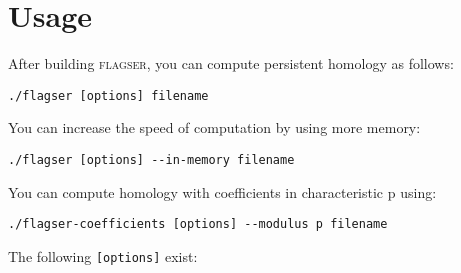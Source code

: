 \documentclass{amsart}
\theoremstyle{definition}
\begin{document}
\section{Usage}
\noindent
After building \textsc{flagser}, you can compute persistent homology as follows:

\vspace{1em}

\begin{verbatim}./flagser [options] filename\end{verbatim}

\vspace{1em}

You can increase the speed of computation by using more memory:

\vspace{1em}

\begin{verbatim}./flagser [options] --in-memory filename\end{verbatim}

\vspace{1em}

You can compute homology with coefficients in characteristic p using:

\vspace{1em}

\begin{verbatim}./flagser-coefficients [options] --modulus p filename\end{verbatim}

\vspace{1em}

\noindent
The following \texttt{[options]} exist:
\end{document}
